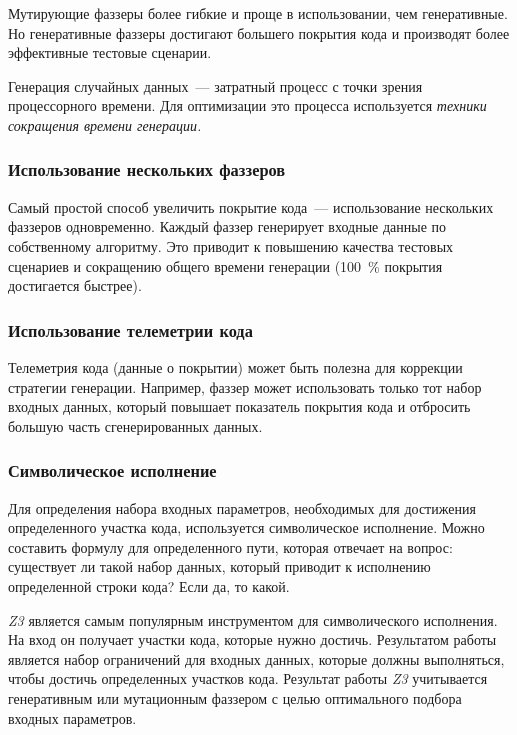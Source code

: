  Мутирующие фаззеры более гибкие и проще в использовании, чем генеративные. Но генеративные фаззеры достигают большего покрытия кода и производят более эффективные тестовые сценарии.
 
 Генерация случайных данных~--- затратный процесс с точки зрения процессорного времени. Для оптимизации это процесса используется    \textit{техники сокращения времени генерации.}
 
 
 \subsubsection{Использование нескольких фаззеров}
 
 Самый простой способ увеличить покрытие кода~--- использование нескольких фаззеров одновременно. Каждый фаззер генерирует входные данные по собственному алгоритму. Это приводит к повышению качества тестовых сценариев и сокращению общего времени генерации (100~\% покрытия достигается быстрее).
 
 \subsubsection{Использование телеметрии кода}
 
 Телеметрия кода (данные о покрытии) может быть полезна для коррекции стратегии генерации. Например, фаззер может использовать только тот набор входных данных, который повышает показатель покрытия кода и отбросить большую часть сгенерированных данных.
  
 \subsubsection{Символическое исполнение}
 
 Для определения набора входных параметров, необходимых для достижения определенного участка кода, используется символическое исполнение. Можно составить формулу для определенного пути, которая отвечает на вопрос: существует ли такой набор данных, который приводит к исполнению определенной строки кода? Если да, то какой. 
 
\textit{Z3} является самым популярным инструментом для символического исполнения. На вход он получает участки кода, которые нужно достичь. Результатом работы является набор ограничений для входных данных, которые должны выполняться, чтобы достичь определенных участков кода. Результат работы \textit{Z3} учитывается генеративным или мутационным фаззером с целью оптимального подбора входных параметров. 

